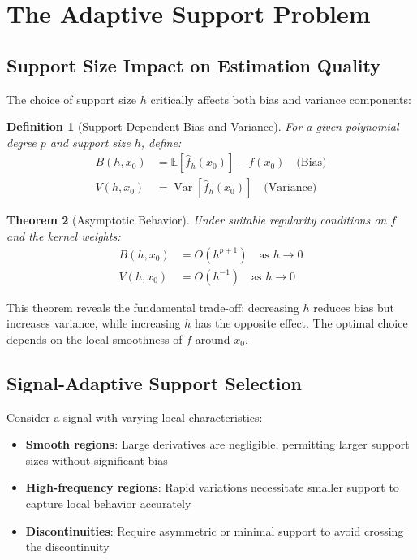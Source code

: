 \documentclass[12pt]{article}
\DeclareMathOperator{\Var}{Var}
\newcommand{\E}{\mathbb{E}}
\newtheorem{theorem}{Theorem}[section]
\newtheorem{definition}[theorem]{Definition}
\begin{document}
\newpage

\section{The Adaptive Support Problem}

\subsection{Support Size Impact on Estimation Quality}

The choice of support size $h$ critically affects both bias and variance components:

\begin{definition}[Support-Dependent Bias and Variance]
    For a given polynomial degree $p$ and support size $h$, define:
    \begin{align}
        B(h, x_0) & = \E[\hat{f}_h(x_0)] - f(x_0) \quad \text{(Bias)} \\
        V(h, x_0) & = \Var[\hat{f}_h(x_0)] \quad \text{(Variance)}
    \end{align}
\end{definition}

\begin{theorem}[Asymptotic Behavior]
    \label{thm:asymptotic}
    Under suitable regularity conditions on $f$ and the kernel weights:
    \begin{align}
        B(h, x_0) & = O(h^{p+1}) \quad \text{as } h \to 0 \\
        V(h, x_0) & = O(h^{-1}) \quad \text{as } h \to 0
    \end{align}
\end{theorem}

This theorem reveals the fundamental trade-off: decreasing $h$ reduces bias but increases variance, while increasing $h$ has the opposite effect. The optimal choice depends on the local smoothness of $f$ around $x_0$.

\subsection{Signal-Adaptive Support Selection}

Consider a signal with varying local characteristics:

\begin{itemize}
    \item \textbf{Smooth regions}: Large derivatives are negligible, permitting larger support sizes without significant bias
    \item \textbf{High-frequency regions}: Rapid variations necessitate smaller support to capture local behavior accurately
    \item \textbf{Discontinuities}: Require asymmetric or minimal support to avoid crossing the discontinuity
\end{itemize}
\end{document}
